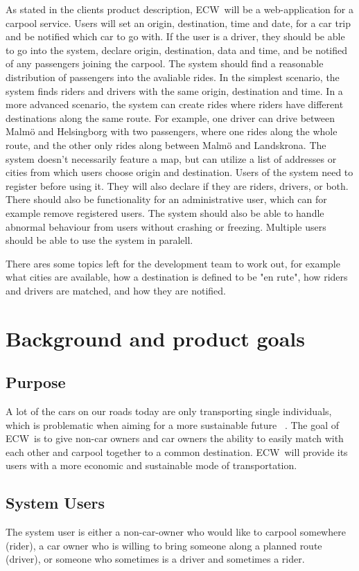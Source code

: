 \documentclass{article}
\newcommand{\name}{ECW\ }
\begin{document}
As stated in the clients product description\cite{PH}, \name will be a web-application for a carpool service. Users will set an origin, destination, time and date, for a car trip and be notified which car to go with. If the user is a driver, they should be able to go into the system, declare origin, destination, data and time, and be notified of any passengers joining the carpool. The system should find a reasonable distribution of passengers into the avaliable rides. In the simplest scenario, the system finds riders and drivers with the same origin, destination and time. In a more advanced scenario, the system can create rides where riders have different destinations along the same route. For example, one driver can drive between Malmö and Helsingborg with two passengers, where one rides along the whole route, and the other only rides along between Malmö and Landskrona. The system doesn't necessarily feature a map, but can utilize a list of addresses or cities from which users choose origin and destination. Users of the system need to register before using it. They will also declare if they are riders, drivers, or both. There should also be functionality for an administrative user, which can for example remove registered users. The system should also be able to handle abnormal behaviour from users without crashing or freezing. Multiple users should be able to use the system in paralell.

There ares some topics left for the development team to work out, for example what cities are available, how a destination is defined to be "en rute", how riders and drivers are matched, and how they are notified.

\section{Background and product goals}
\subsection{Purpose}
A lot of the cars on our roads today are only transporting single individuals, which is problematic when aiming for a more sustainable future ~\cite{BNL}. The goal of \name is to give non-car owners and car owners the ability to easily match with each other and carpool together to a common destination. \name will provide its users with a more economic and sustainable mode of transportation.

\subsection{System Users}
The system user is either a non-car-owner who would like to carpool somewhere (rider), a car owner who is willing to bring someone along a planned route (driver), or someone who sometimes is a driver and sometimes a rider.
\end{document}
